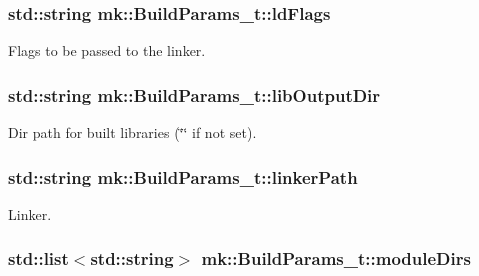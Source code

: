 \subsubsection[{\texorpdfstring{ld\+Flags}{ldFlags}}]{\setlength{\rightskip}{0pt plus 5cm}std\+::string mk\+::\+Build\+Params\+\_\+t\+::ld\+Flags}\hypertarget{structmk_1_1_build_params__t_a13ef4d956196d04026f380b506016e3b}{}\label{structmk_1_1_build_params__t_a13ef4d956196d04026f380b506016e3b}


Flags to be passed to the linker. 

\subsubsection[{\texorpdfstring{lib\+Output\+Dir}{libOutputDir}}]{\setlength{\rightskip}{0pt plus 5cm}std\+::string mk\+::\+Build\+Params\+\_\+t\+::lib\+Output\+Dir}\hypertarget{structmk_1_1_build_params__t_a539fd8767623678f93944364d0a0ebb8}{}\label{structmk_1_1_build_params__t_a539fd8767623678f93944364d0a0ebb8}


Dir path for built libraries (\char`\"{}\char`\"{} if not set). 

\subsubsection[{\texorpdfstring{linker\+Path}{linkerPath}}]{\setlength{\rightskip}{0pt plus 5cm}std\+::string mk\+::\+Build\+Params\+\_\+t\+::linker\+Path}\hypertarget{structmk_1_1_build_params__t_a979d017b0fce3727dce2238bec4460df}{}\label{structmk_1_1_build_params__t_a979d017b0fce3727dce2238bec4460df}


Linker. 

\subsubsection[{\texorpdfstring{module\+Dirs}{moduleDirs}}]{\setlength{\rightskip}{0pt plus 5cm}std\+::list$<$std\+::string$>$ mk\+::\+Build\+Params\+\_\+t\+::module\+Dirs}\hypertarget{structmk_1_1_build_params__t_a80145edd6bbe35fd79fce6e9075906ef}{}\label{structmk_1_1_build_params__t_a80145edd6bbe35fd79fce6e9075906ef}


